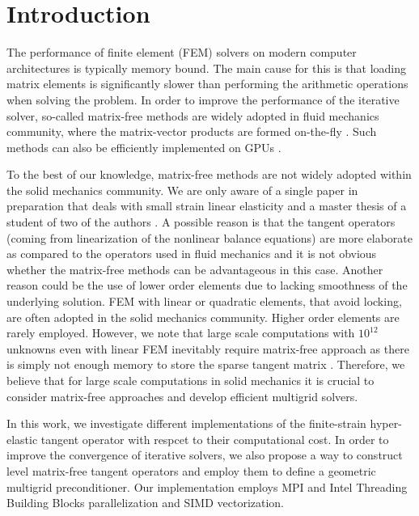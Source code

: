\documentclass[preprint,12pt,times]{elsarticle}
\begin{document}
\section{Introduction}

The performance of finite element (FEM) solvers on modern computer architectures is typically memory bound.
The main cause for this is that loading matrix elements is significantly slower than performing the arithmetic operations when solving the problem.
In order to improve the performance of the iterative solver, so-called matrix-free methods are
widely adopted in fluid mechanics community, where the matrix-vector products are formed on-the-fly \cite{kronbichler12,May2015, Krank2017, Brown2010, Gmeiner2016}. Such methods can also be efficiently implemented on GPUs \cite{Abdelfattah2016, ljungkvist2017multigrid}.

To the best of our knowledge, matrix-free methods are not widely adopted within the solid mechanics community.
We are only aware of a single paper in preparation that deals with small strain linear elasticity \cite{Clevenger2018} and a master thesis of a student of two of the authors \cite{Mentler2017}.
A possible reason is that the tangent operators (coming from linearization of the nonlinear balance equations) are
more elaborate as compared to the operators used in fluid mechanics and it is not obvious whether the matrix-free methods can be advantageous in this case. Another reason could be the use of lower order elements due to lacking smoothness of the underlying solution. FEM with linear or quadratic elements, that avoid locking, are often adopted in the solid mechanics community. Higher order elements are rarely employed. However, we note that large scale computations with $10^{12}$ unknowns even with linear FEM inevitably require matrix-free approach as there is simply not enough memory to store the sparse tangent matrix \cite{Gmeiner2016}. Therefore, we believe that for large scale computations in solid mechanics it is crucial to consider matrix-free approaches and develop efficient multigrid solvers.

In this work, we investigate different implementations of the finite-strain hyper-elastic tangent operator with respcet to their computational cost.
In order to improve the convergence of iterative solvers, we also propose a way to construct level matrix-free tangent operators
and employ them to define a geometric multigrid preconditioner.
Our implementation employs MPI and Intel Threading Building Blocks parallelization and SIMD vectorization.
\end{document}
